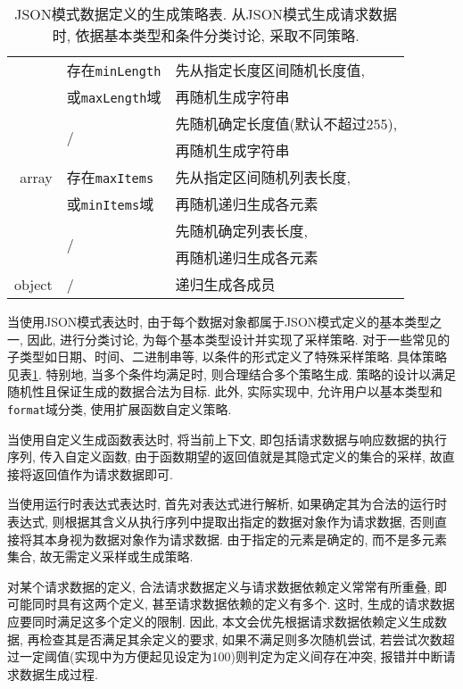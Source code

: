 \begin{table}[!htb]
\begin{tabular}{rll}
                & 存在\texttt{minLength} & 先从指定长度区间随机长度值, \\
                & 或\texttt{maxLength}域 & 再随机生成字符串 \\
                \cline{2-3}
                & \multirow{2}{*}{/} & 先随机确定长度值(默认不超过255),\\
                & & 再随机生成字符串 \\
                \hline
                array & 存在\texttt{maxItems} & 先从指定区间随机列表长度,\\
                & 或\texttt{minItems}域 & 再随机递归生成各元素 \\
                \cline{2-3}
                & \multirow{2}{*}{/} & 先随机确定列表长度,\\
                & & 再随机递归生成各元素 \\
                \hline
                object & / & 递归生成各成员 \\
                \bottomrule
            \end{tabular}
            \caption[JSON模式数据定义的生成策略表.]{JSON模式数据定义的生成策略表. 从JSON模式生成请求数据时, 依据基本类型和条件分类讨论, 采取不同策略.}
            \label{tab:schemagen}
        \end{table}
    
        当使用JSON模式表达时, 由于每个数据对象都属于JSON模式定义的基本类型之一, 因此, 进行分类讨论, 为每个基本类型设计并实现了采样策略. 对于一些常见的子类型如日期、时间、二进制串等, 以条件的形式定义了特殊采样策略. 具体策略见表\ref{tab:schemagen}. 特别地, 当多个条件均满足时, 则合理结合多个策略生成. 策略的设计以满足随机性且保证生成的数据合法为目标. 此外, 实际实现中, 允许用户以基本类型和\texttt{format}域分类, 使用扩展函数自定义策略.
        
        当使用自定义生成函数表达时, 将当前上下文, 即包括请求数据与响应数据的执行序列, 传入自定义函数, 由于函数期望的返回值就是其隐式定义的集合的采样, 故直接将返回值作为请求数据即可.
        
        当使用运行时表达式表达时, 首先对表达式进行解析, 如果确定其为合法的运行时表达式, 则根据其含义从执行序列中提取出指定的数据对象作为请求数据, 否则直接将其本身视为数据对象作为请求数据. 由于指定的元素是确定的, 而不是多元素集合, 故无需定义采样或生成策略.
        
        对某个请求数据的定义, 合法请求数据定义与请求数据依赖定义常常有所重叠, 即可能同时具有这两个定义, 甚至请求数据依赖的定义有多个. 这时, 生成的请求数据应要同时满足这多个定义的限制. 因此, 本文会优先根据请求数据依赖定义生成数据, 再检查其是否满足其余定义的要求, 如果不满足则多次随机尝试, 若尝试次数超过一定阈值(实现中为方便起见设定为100)则判定为定义间存在冲突, 报错并中断请求数据生成过程.
        
